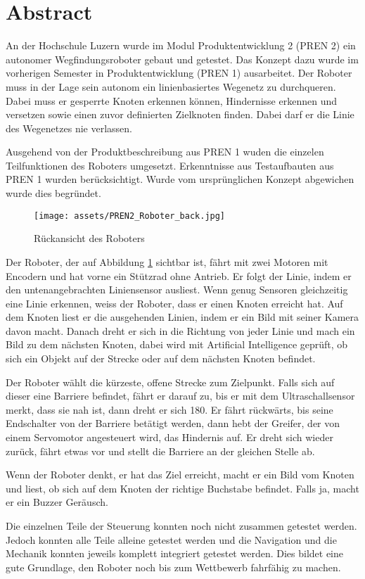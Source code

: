 \section*{Abstract}


An der Hochschule Luzern wurde im Modul Produktentwicklung 2 (PREN 2) ein autonomer Wegfindungsroboter gebaut und getestet. Das Konzept dazu wurde im vorherigen Semester in Produktentwicklung (PREN 1) ausarbeitet. Der Roboter muss in der Lage sein autonom ein linienbasiertes Wegenetz zu durchqueren. Dabei muss er gesperrte Knoten erkennen können, Hindernisse erkennen und versetzen sowie einen zuvor definierten Zielknoten finden. Dabei darf er die Linie des Wegenetzes nie verlassen.


Ausgehend von der Produktbeschreibung aus PREN 1 wuden die einzelen Teilfunktionen des Roboters umgesetzt. Erkenntnisse aus Testaufbauten aus PREN 1 wurden berücksichtigt. Wurde vom ursprünglichen Konzept abgewichen wurde dies begründet. 

\begin{figure}[h]
    \centering
    \texttt{[image: assets/PREN2\_Roboter\_back.jpg]}
    \caption{Rückansicht des Roboters}
    \label{fig:roboter_back}
\end{figure}


Der Roboter, der auf Abbildung \ref{fig:roboter_back} sichtbar ist, fährt mit zwei Motoren mit Encodern und hat vorne ein Stützrad ohne Antrieb. Er folgt der Linie, indem er den untenangebrachten Liniensensor ausliest. Wenn genug Sensoren gleichzeitig eine Linie erkennen, weiss der Roboter, dass er einen Knoten erreicht hat. Auf dem Knoten liest er die ausgehenden Linien, indem er ein Bild mit seiner Kamera davon macht. Danach dreht er sich in die Richtung von jeder Linie und mach ein Bild zu dem nächsten Knoten, dabei wird mit Artificial Intelligence geprüft, ob sich ein Objekt auf der Strecke oder auf dem nächsten Knoten befindet.

Der Roboter wählt die kürzeste, offene Strecke zum Zielpunkt. Falls sich auf dieser eine Barriere befindet, fährt er darauf zu, bis er mit dem Ultraschallsensor merkt, dass sie nah ist, dann dreht er sich 180\textdegree. Er fährt rückwärts, bis seine Endschalter von der Barriere betätigt werden, dann hebt der Greifer, der von einem Servomotor angesteuert wird, das Hindernis auf. Er dreht sich wieder zurück, fährt etwas vor und stellt die Barriere an der gleichen Stelle ab.

Wenn der Roboter denkt, er hat das Ziel erreicht, macht er ein Bild vom Knoten und liest, ob sich auf dem Knoten der richtige Buchstabe befindet. Falls ja, macht er ein Buzzer Geräusch.


Die einzelnen Teile der Steuerung konnten noch nicht zusammen getestet werden. Jedoch konnten alle Teile alleine getestet werden und die Navigation und die Mechanik konnten jeweils komplett integriert getestet werden. Dies bildet eine gute Grundlage, den Roboter noch bis zum Wettbewerb fahrfähig zu machen.
